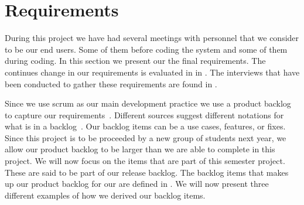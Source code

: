 \section{Requirements}
\label{sec:requirements}
During this project we have had several meetings with personnel that we consider to be our end users.
Some of them before coding the system and some of them during coding.
In this section we present our the final requirements.
The continues change in our requirements is evaluated in  in .
The interviews that have been conducted to gather these requirements are found in .

Since we use scrum as our main development practice we use a product backlog to capture our requirements~\cite[p.~114]{Larman04}.
Different sources suggest different notations for what is in a backlog~\cite[p.~17]{scrumchecklist}\cite[pp.~123-124]{Larman04}.
Our backlog items can be a use cases, features, or fixes.
Since this project is to be proceeded by a new group of students next year, we allow our product backlog to be larger than we are able to complete in this project.
We will now focus on the items that are part of this semester project.
These are said to be part of our release backlog.
The backlog items that makes up our product backlog for our \subsystem{} are defined in .
We will now present three different examples of how we derived our backlog items.

